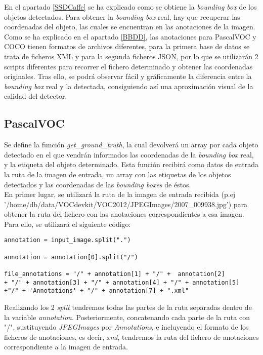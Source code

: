 \documentclass[a4paper, 12pt, spanish, chapterprefix, numbers=noenddot]{book}
\begin{document}
En el apartado \ref{SSDCaffe} se ha explicado como se obtiene la \textit{bounding box} de los objetos detectados. Para obtener la \textit{bounding box} real, hay que recuperar las coordenadas del objeto, las cuales se encuentran en las anotaciones de la imagen. Como se ha explicado en el apartado \ref{BBDD}, las anotaciones para PascalVOC y COCO tienen formatos de archivos diferentes, para la primera base de datos se trata de ficheros XML y para la segunda ficheros JSON, por lo que se utilizarán 2 scripts diferentes para recorrer el fichero determinado y obtener las coordenadas originales. Tras ello, se podrá observar fácil y gráficamente la diferencia entre la \textit{bounding box} real y la detectada, consiguiendo así una aproximación visual de la calidad del detector.

\subsection{PascalVOC}\label{ComparePascalVOC}

Se define la función \textit{get\_ground\_truth}, la cual devolverá un array por cada objeto detectado en el que vendrán informados las coordenadas de la \textit{bounding box} real, y la etiqueta del objeto determinado. Esta función recibirá como datos de entrada la ruta de la imagen de entrada, un array con las etiquetas de los objetos detectados y las coordenadas de las \textit{bounding boxes} de éstos.\\

En primer lugar, se utilizará la ruta de la imagen de entrada recibida (p.ej '/home/db/data/VOCdevkit/VOC2012/JPEGImages/2007\_009938.jpg') para obtener la ruta del fichero con las anotaciones correspondientes a esa imagen. Para ello, se utilizará el siguiente código:\\

\begin{lstlisting}[frame=single]
annotation = input_image.split(".")

annotation = annotation[0].split("/")

file_annotations = "/" + annotation[1] + "/" +  annotation[2] 
+ "/" + annotation[3] + "/" + annotation[4] + "/" + annotation[5] 
+"/" + 'Annotations' + "/" + annotation[7] + ".xml"
\end{lstlisting}

Realizando los 2 \textit{split} tendremos todas las partes de la ruta separadas dentro de la variable \textit{annotation}. Posteriormente, concatenando cada parte de la ruta con "/", sustituyendo \textit{JPEGImages} por \textit{Annotations}, e incluyendo el formato de los ficheros de anotaciones, es decir, \textit{xml}, tendremos la ruta del fichero de anotaciones correspondiente a la imagen de entrada.\\
\end{document}
